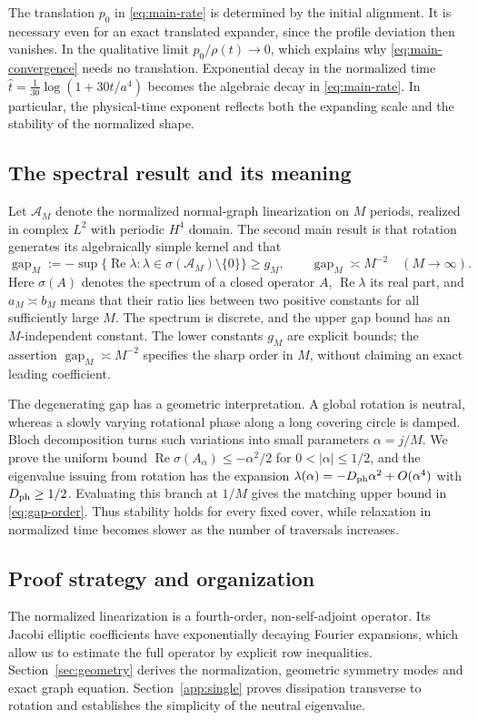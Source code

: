 \documentclass[a4paper,11pt]{article}
\numberwithin{equation}{section}
\theoremstyle{definition}
\theoremstyle{remark}
\newcommand{\gap}{\operatorname{gap}}
\renewcommand{\Re}{\operatorname{Re}}
\begin{document}
The translation $p_0$ in \eqref{eq:main-rate} is determined by the initial alignment. It is necessary even for an exact translated expander, since the profile deviation then vanishes. In the qualitative limit $p_0/\rho(t)\to0$, which explains why \eqref{eq:main-convergence} needs no translation. Exponential decay in the normalized time $\widehat t=\frac1{30}\log(1+30t/a^4)$ becomes the algebraic decay in \eqref{eq:main-rate}. In particular, the physical-time exponent reflects both the expanding scale and the stability of the normalized shape.

\subsection{The spectral result and its meaning}
Let $\mathcal A_M$ denote the normalized normal-graph linearization on $M$ periods, realized in complex $L^2$ with periodic $H^4$ domain. The second main result is that rotation generates its algebraically simple kernel and that
\begin{equation}\label{eq:gap-order}
 \gap_M:=-\sup\{\Re\lambda:\lambda\in\sigma(\mathcal A_M)\setminus\{0\}\}
 \ge g_M,\qquad \gap_M\asymp M^{-2}\quad(M\to\infty).
\end{equation}
Here $\sigma(A)$ denotes the spectrum of a closed operator $A$, $\Re\lambda$ its real part, and $a_M\asymp b_M$ means that their ratio lies between two positive constants for all sufficiently large $M$. The spectrum is discrete, and the upper gap bound has an $M$-independent constant. The lower constants $g_M$ are explicit bounds; the assertion $\gap_M\asymp M^{-2}$ specifies the sharp order in $M$, without claiming an exact leading coefficient.

The degenerating gap has a geometric interpretation. A global rotation is neutral, whereas a slowly varying rotational phase along a long covering circle is damped. Bloch decomposition turns such variations into small parameters $\alpha=j/M$. We prove the uniform bound $\Re\sigma(A_\alpha)\le-\alpha^2/2$ for $0<|\alpha|\le1/2$, and the eigenvalue issuing from rotation has the expansion $\lambda(\alpha)=-D_{\rm ph}\alpha^2+O(\alpha^4)$ with $D_{\rm ph}\ge1/2$. Evaluating this branch at $1/M$ gives the matching upper bound in \eqref{eq:gap-order}. Thus stability holds for every fixed cover, while relaxation in normalized time becomes slower as the number of traversals increases.

\subsection{Proof strategy and organization}
The normalized linearization is a fourth-order, non-self-adjoint operator. Its Jacobi elliptic coefficients have exponentially decaying Fourier expansions, which allow us to estimate the full operator by explicit row inequalities. Section~\ref{sec:geometry} derives the normalization, geometric symmetry modes and exact graph equation. Section~\ref{app:single} proves dissipation transverse to rotation and establishes the simplicity of the neutral eigenvalue.
\end{document}
